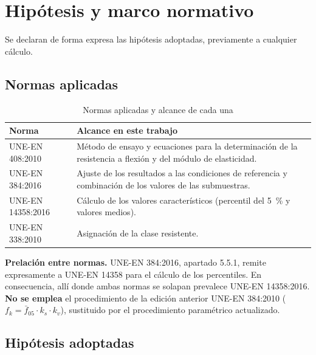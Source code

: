 \documentclass[11pt,a4paper]{article}
\begin{document}
\section{Hipótesis y marco normativo}

Se declaran de forma expresa las hipótesis adoptadas, previamente a cualquier
cálculo.

\subsection{Normas aplicadas}

\begin{table}[htbp]
\centering
\caption{Normas aplicadas y alcance de cada una}
\begin{tabular}{lp{9.5cm}}
\toprule
\textbf{Norma} & \textbf{Alcance en este trabajo} \\
\midrule
UNE-EN 408:2010   & Método de ensayo y ecuaciones para la determinación de la resistencia a flexión y del módulo de elasticidad. \\
UNE-EN 384:2016   & Ajuste de los resultados a las condiciones de referencia y combinación de los valores de las submuestras. \\
UNE-EN 14358:2016 & Cálculo de los valores característicos (percentil del \SI{5}{\percent} y valores medios). \\
UNE-EN 338:2010   & Asignación de la clase resistente. \\
\bottomrule
\end{tabular}
\end{table}

\noindent\textbf{Prelación entre normas.} UNE-EN 384:2016, apartado 5.5.1, remite
expresamente a UNE-EN 14358 para el cálculo de los percentiles. En consecuencia, allí
donde ambas normas se solapan prevalece UNE-EN 14358:2016. \textbf{No se emplea} el
procedimiento de la edición anterior UNE-EN 384:2010
($f_{k} = \bar{f}_{05}\cdot k_{s}\cdot k_{v}$), sustituido por el procedimiento
paramétrico actualizado.

\subsection{Hipótesis adoptadas}
\end{document}
